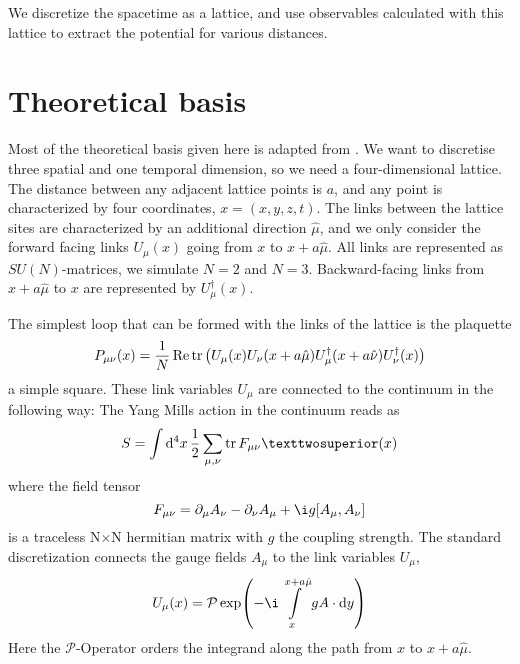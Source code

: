 \documentclass[%
 reprint,
 amsmath,amssymb,
 aps,
]{revtex4-1}
\renewcommand{\Re}{\operatorname{Re}}
\begin{document}
We discretize the spacetime as a lattice, and use observables calculated with this lattice to extract the potential for various distances.

%


\section{Theoretical basis}

Most of the theoretical basis given here is adapted from \citet{lepagelqcd}. We want to discretise three spatial and one temporal dimension, so we need a four-dimensional lattice. The distance between any adjacent lattice points is $a$, and any point is characterized by four coordinates, $x=(x,y,z,t)$. The links between the lattice sites are characterized by an additional direction $\hat{\mu}$, and we only consider the forward facing links $U_\mu(x)$ going from $x$ to $x+a\hat{\mu}$. All links are represented as $SU(N)$-matrices, we simulate $N=2$ and $N=3$. Backward-facing links from $x+a\hat{\mu}$ to $x$ are represented by $U_\mu^\dagger(x)$.

The simplest loop that can be formed with the links of the lattice is the plaquette \[P_{\mu\nu}(x)=\frac{1}{N}\Re\tr\left(U_\mu(x)U_\nu(x+a\hat{\mu})U_\mu^\dagger(x+a\hat{\nu})U^\dagger_\nu(x)\right)\] a simple square. These link variables $U_\mu$ are connected to the continuum in the following way: The Yang Mills action in the continuum reads as \[S=\int\dd{^4x}\dfrac{1}{2}\sum\limits_{\mu,\nu}\tr F_{\mu\nu}²(x)\] where the field tensor\[F_{\mu\nu}=\partial_\mu A_\nu-\partial_\nu A_\mu+\i g [A_\mu,A_\nu]\] is a traceless N$\times$N hermitian matrix with $g$ the coupling strength. The standard discretization connects the gauge fields $A_\mu$ to the link variables $U_\mu$, \[U_\mu(x)=\mathcal{P}\exp(-\i\int\limits_{x}^{x+a\hat{\mu}}g A\cdot\dd{y})\]
Here the $\mathcal{P}$-Operator orders the integrand along the path from $x$ to $x+a\hat{\mu}$.
\end{document}
